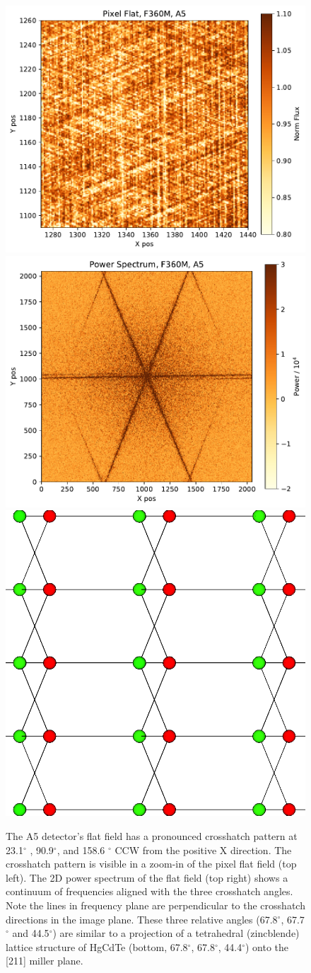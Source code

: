 \documentclass{aastex62}
\newcommand{\degree}{^\circ}
\begin{document}
\begin{figure}[!hbtp]
\centering
\includegraphics[width=.49\columnwidth]{crosshatch_zoom.pdf}
\includegraphics[width=.49\columnwidth]{crosshatch_2d_power.pdf}
\includegraphics[width=.3\columnwidth]{tetrahedral_lattice_projection.png}
\caption{
The A5 detector's flat field has a pronounced crosshatch pattern at 23.1$\degree$ , 90.9$\degree$, and 158.6 $\degree$ CCW from the positive X direction.
The crosshatch pattern is visible in a zoom-in of the pixel flat field (top left).
The 2D power spectrum of the flat field (top right) shows a continuum of frequencies aligned with the three crosshatch angles.
Note the lines in frequency plane are perpendicular to the crosshatch directions in the image plane.
These three relative angles (67.8$\degree$, 67.7$\degree$ and 44.5$\degree$) are similar to a projection of a tetrahedral (zincblende) lattice structure of HgCdTe (bottom, 67.8$\degree$, 67.8$\degree$, 44.4$\degree$) onto the [211] miller plane.
}\label{fig:crossHatchA5}
\end{figure}
\end{document}
